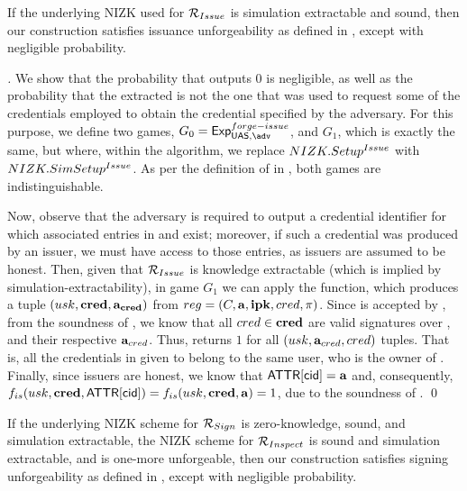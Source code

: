 \begin{theorem}
  \label{thm:issue-forge-uas}
  If the underlying NIZK used for $\mathcal{R}_{Issue}$ is simulation extractable
  and sound, then our \CUASGen construction satisfies issuance unforgeability as
  defined in , except with negligible probability.
\end{theorem}

\begin{proof}[]
  We show that the probability that \fissue outputs $0$ is negligible, as well
  as the probability that the extracted \usk is not the one that was used to
  request some of the credentials employed to obtain the credential specified by
  the adversary.
  For this purpose, we define two games, $G_0=\ExpForgeIssue$, and $G_1$, which
  is exactly the same, but where, within the \Setup algorithm, we replace
  $NIZK.Setup^{Issue}$ with $NIZK.SimSetup^{Issue}$. As per the definition of
  \NIZK in , both games are indistinguishable.

  Now, observe that the adversary is required to output a credential
  identifier for which associated entries in \trans and \CRED exist; moreover,
  if such a credential was produced by an issuer, we must have access to those
  entries, as issuers are assumed to be honest.
  Then, given that $\mathcal{R}_{Issue}$ is knowledge extractable (which is implied
  by simulation-extractability), in game $G_1$
  we can apply the \NIZKExtract function, which produces a tuple $(usk,\mathbf{cred},
  \mathbf{a}_{\mathbf{cred}})$ from $reg = (C,\mathbf{a},\mathbf{ipk},cred,\pi)$.
  Since \NIZKproof is accepted by \ExtractIssue, from the soundness of \NIZK, we
  know that all $cred \in \mathbf{cred}$ are valid signatures over \usk, and their
  respective $\mathbf{a}_{cred}$. Thus, \IdentifyCred returns $1$ for all $(usk,
  \mathbf{a}_{cred},cred)$ tuples. That is, all the credentials in \scred given
  to \fissue belong to the same user, who is the owner of \usk.
  Finally, since issuers are honest, we know that $\mathsf{ATTR}[\mathsf{cid}] = \mathbf{a}$ and,
  consequently, $f_{is}(usk,\mathbf{cred},\mathsf{ATTR}[\mathsf{cid}]) = f_{is}(usk,\mathbf{cred},\mathbf{a})
  = 1$, due to the soundness of \NIZK.
  \qed
\end{proof}

\begin{theorem}
  \label{thm:sign-forge-uas}
  If the underlying NIZK scheme for $\mathcal{R}_{Sign}$ is zero-knowledge, sound,
  and simulation extractable, the NIZK scheme for $\mathcal{R}_{Inspect}$ is sound
  and simulation extractable, and \SBCM is one-more unforgeable, then our
  \CUASGen construction satisfies signing unforgeability as defined in
  , except with negligible probability.
\end{theorem}

